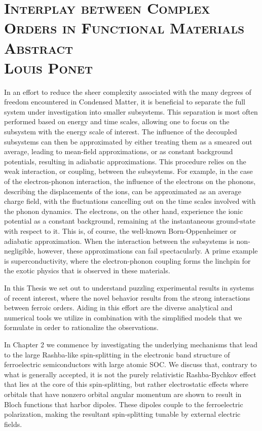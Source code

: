 \documentclass[10pt, a4paper]{article}
\begin{document}
\section*{\textsc{{\huge Interplay between Complex Orders in Functional Materials}\\[0.1cm] Abstract\\[0.2cm] {\normalsize Louis Ponet}}}

\vspace{0.4cm}
In an effort to reduce the sheer complexity associated with the many degrees of freedom encountered in Condensed Matter, it is beneficial to separate the full system under investigation into smaller subsystems.
This separation is most often performed based on energy and time scales, allowing one to focus on the subsystem with the energy scale of interest.
The influence of the decoupled subsystems can then be approximated by either treating them as a smeared out average, leading to mean-field approximations, or as constant background potentials, resulting in adiabatic approximations. This procedure relies on the weak interaction, or coupling, between the subsystems.
For example, in the case of the electron-phonon interaction, the influence of the electrons on the phonons, describing the displacements of the ions, can be approximated as an average charge field, with the fluctuations cancelling out on the time scales involved with the phonon dynamics.
The electrons, on the other hand, experience the ionic potential as a constant background, remaining at the instantaneous ground-state with respect to it. This is, of course, the well-known Born-Oppenheimer or adiabatic approximation.
When the interaction between the subsystems is non-negligible, however, these approximations can fail spectacularly.
A prime example is superconductivity, where the electron-phonon coupling forms the linchpin for the exotic physics that is observed in these materials.

In this Thesis we set out to understand puzzling experimental results in systems of recent interest, where the novel behavior results from the strong interactions between ferroic orders.
Aiding in this effort are the diverse analytical and numerical tools we utilize in combination with the simplified models that we formulate in order to rationalize the observations. 

In Chapter 2 we commence by investigating the underlying mechanisms that lead to the large Rashba-like spin-splitting in the electronic band structure of ferroelectric semiconductors with large atomic SOC.
We discuss that, contrary to what is generally accepted, it is not the purely relativistic Rashba-Bychkov effect that lies at the core of this spin-splitting, but rather electrostatic effects where orbitals that have nonzero orbital angular momentum are shown to result in Bloch functions that harbor dipoles. These dipoles couple to the ferroelectric polarization, making the resultant spin-splitting tunable by external electric fields.
\end{document}
